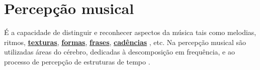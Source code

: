 
\chapter{Percepção musical}
\label{cap:percepcaomusical}
\begin{definition} 
\label{def:PercepcaoMusical}
É a capacidade de distinguir e reconhecer aspectos da música 
tais como melodias, ritmos, \hyperref[sec:texturasmusica]{\textbf{texturas}}, 
\hyperref[sec:FormaMusical]{\textbf{formas}}, 
\hyperref[sec:Frase]{\textbf{frases}}, 
\hyperref[sec:Cadencia]{\textbf{cadências}} \cite[pp. 29]{teoriamusicala2012}, etc.
Na percepção musical são utilizadas áreas do cérebro, 
dedicadas à descomposição em frequência,
e ao processo de percepção de estruturas de tempo \cite{de2019especializacao}.
\end{definition}












